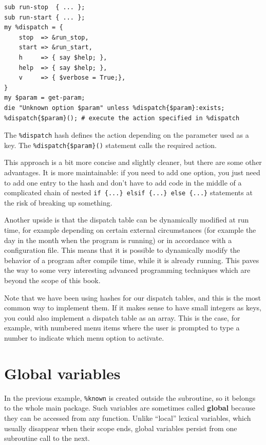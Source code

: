 \begin{verbatim}
sub run-stop  { ... };
sub run-start { ... };
my %dispatch = {
    stop  => &run_stop,
    start => &run_start,
    h     => { say $help; },
    help  => { say $help; },
    v     => { $verbose = True;},
}
my $param = get-param;
die "Unknown option $param" unless %dispatch{$param}:exists;
%dispatch{$param}(); # execute the action specified in %dispatch
\end{verbatim}

The \verb'%dispatch' hash defines the action depending on 
the parameter used as a key. The \verb'%dispatch{$param}()' 
statement calls the required action.

This approach is a bit more concise and slightly cleaner, but there 
are some other advantages. It is more maintainable: if you need 
to add one option, you just need to add one entry to the hash 
and don't have to add code in the middle of a complicated 
chain of nested \verb'if {...} elsif {...} else {...}' 
statements at the risk of breaking up something. 

Another upside is that the dispatch table can be dynamically 
modified at run time, for example depending on certain 
external circumstances (for example the day in the month when 
the program is running) or in accordance with a configuration 
file. This means that it is possible to dynamically modify 
the behavior of a program after compile time, while it is 
already running. This paves the way to some very interesting 
advanced programming techniques which are beyond the scope 
of this book.

Note that we have been using hashes for our dispatch tables, 
and this is the most common way to implement them. If it 
makes sense to have small integers as keys, you could also 
implement a dispatch table as an array. This is the case, 
for example, with numbered menu items where the user is 
prompted to type a number to indicate which menu option 
to activate.


\section{Global variables}

In the previous example, \verb'%known' is created outside the subroutine,
so it belongs to the whole main package.
Such variables are sometimes called {\bf global} 
because they can be accessed from any function.  Unlike ``local'' 
lexical variables, which usually disappear when their scope 
ends, global variables persist from one subroutine call to 
the next.

